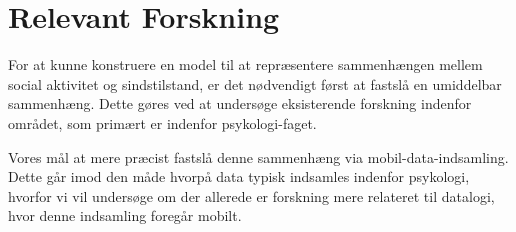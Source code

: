 \section{Relevant Forskning}
For at kunne konstruere en model til at repræsentere sammenhængen mellem social aktivitet og sindstilstand, er det nødvendigt først at fastslå en umiddelbar sammenhæng.
Dette gøres ved at undersøge eksisterende forskning indenfor området, som primært er indenfor psykologi-faget.

Vores mål at mere præcist fastslå denne sammenhæng via mobil-data-indsamling.
Dette går imod den måde hvorpå data typisk indsamles indenfor psykologi, hvorfor vi vil undersøge om der allerede er forskning mere relateret til datalogi, hvor denne indsamling foregår mobilt.
